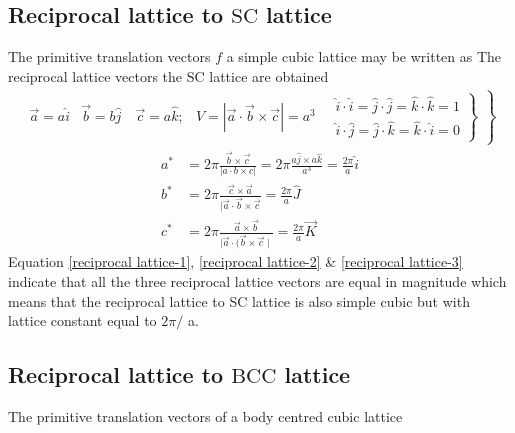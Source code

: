 \subsection{Reciprocal lattice to $\mathrm{SC}$ lattice}
The primitive translation vectors $f$ a simple cubic lattice may be written as
The reciprocal lattice vectors the $\mathrm{SC}$ lattice are obtained
\begin{align*}
\left.\begin{array}{lll}
\vec{a}=a \hat{i} & \vec{b}=b \hat{j} \quad \vec{c}=a \hat{k} ; & \left.V=|\vec{a} \cdot \vec{b} \times \vec{c}|=a^{3} \quad \begin{array}{l}
\hat{i} \cdot \hat{i}=\hat{j} \cdot \hat{j}=\hat{k} \cdot \hat{k}=1 \\
\hat{i} \cdot \hat{j}=\hat{j} \cdot \hat{k}=\hat{k} \cdot \hat{i}=0
\end{array}\right\}
\end{array}\right\}
\end{align*}
\begin{align}
a^{*}&=2 \pi \frac{\vec{b} \times \vec{c}}{|a \cdot b \times c|}=2 \pi \frac{a \hat{j} \times a \hat{k}}{a^{3}}=\frac{2 \pi}{a} \hat{i} \label{reciprocal lattice-1}\\
b^{*}&=2 \pi \frac{\vec{c} \times \vec{a}}{|\vec{a} \cdot \vec{b} \times \vec{c}}=\frac{2 \pi}{a} \hat{J}\label{reciprocal lattice-2} \\
c^{*}&=2 \pi \frac{\vec{a} \times \vec{b}}{\mid \vec{a} \cdot(\vec{b} \times \vec{c} \mid}=\frac{2 \pi}{a} \vec{K} \label{reciprocal lattice-3}
\end{align}
Equation \ref{reciprocal lattice-1}, \ref{reciprocal lattice-2} \& \ref{reciprocal lattice-3} indicate that all the three reciprocal lattice vectors are equal in magnitude which means that the reciprocal lattice to SC lattice is also simple cubic but with lattice constant equal to $2 \pi /$ a.

\subsection{Reciprocal lattice to $\mathrm{BCC}$ lattice}

The primitive translation vectors of a body centred cubic lattice


